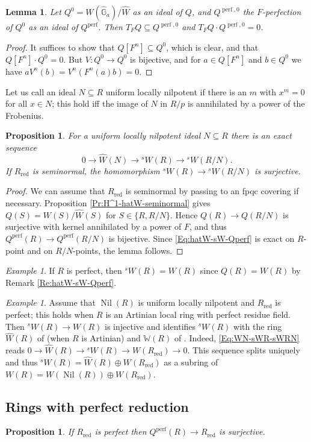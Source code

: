 \documentclass[a4paper,11pt]{amsart}
\theoremstyle{plain}
\newtheorem{Lemma}[equation]{Lemma}
\newtheorem{Prop}[equation]{Proposition}
\theoremstyle{definition}
\theoremstyle{remark}
\newtheorem{Example}[equation]{Example}
\newcommand{\bLe}{\begin{Lemma}}
\newcommand{\eLe}{\end{Lemma}}
\newcommand{\bPr}{\begin{Prop}}
\newcommand{\ePr}{\end{Prop}}
\newcommand{\bEx}{\begin{Example}}
\newcommand{\eEx}{\end{Example}}
\newcommand{\bproof}{\begin{proof}}
\newcommand{\eproof}{\end{proof}}
\newcommand{\beqn}{\begin{equation}}
\newcommand{\eeqn}{\end{equation}}
\numberwithin{equation}{section}
\newcommand{\GG}{{\mathbb{G}}}
\newcommand{\WW}{{\mathbb{W}}}
\DeclareMathOperator{\perf}{perf}
\DeclareMathOperator{\red}{red}
\DeclareMathOperator{\Nil}{Nil}
\newcommand{\limperf}{^{\perf}}
\newcommand{\sW}{{}^sW}
\begin{document}
\bLe
\label{Le:TFQ-Qperf0}
Let $Q^0=W(\hat\GG_a)/\hat W$ as an ideal of $Q$, and $Q^{\perf,0}$ the $F$-perfection of $Q^0$ as an ideal of $Q\limperf$. Then $T_FQ\subseteq Q^{\perf,0}$ and $T_FQ\cdot Q^{\perf,0}=0$.
\eLe

\bproof
It suffices to show that $Q[F^n]\subseteq Q^0$, which is clear, and that $Q[F^n]\cdot Q^0=0$. But $V\colon Q^0\to Q^0$ is bijective, and for $a\in Q[F^n]$ and $b\in Q^0$ we have $aV^n(b)=V^n(F^n(a)b)=0$.
\eproof

Let us call an ideal $N\subseteq R$ uniform locally nilpotent if there is an $m$ with $x^m=0$ for all $x\in N$; this hold iff the image of $N$ in $R/p$ is annihilated by a power of the Frobenius.

\bPr
\label{Pr:WN-sWR-sWRN}
For a uniform locally nilpotent ideal $N\subseteq R$ there is an exact sequence
\beqn
\label{Eq:WN-sWR-sWRN}
0\to\hat W(N)\to\sW(R)\to\sW(R/N).
\eeqn
If $R_{\red}$ is seminormal, the homomorphism $\sW(R)\to\sW(R/N)$ is surjective.
\ePr

\bproof 
We can assume that $R_{\red}$ is seminormal by passing to an fpqc covering if necessary.
Proposition \ref{Pr:H^1-hatW-seminormal} gives $Q(S)=W(S)/\hat W(S)$ for $S\in\{R,R/N\}$. Hence $Q(R)\to Q(R/N)$ is surjective with kernel annihilated by a power of $F$, and thus $Q\limperf(R)\to Q\limperf(R/N)$ is bijective. Since \eqref{Eq:hatW-sW-Qperf} is exact on $R$-point and on $R/N$-points, the lemma follows.
\eproof

\bEx
If $R$ is perfect, then $\sW(R)=W(R)$ since $Q(R)=W(R)$ by Remark \ref{Re:hatW-sW-Qperf}.
\eEx

\bEx
\label{Ex:Artin}
Assume that $\Nil(R)$ is uniform locally nilpotent and $R_{\red}$ is perfect; this holds when $R$ is an Artinian local ring with perfect residue field. Then $\sW(R)\to W(R)$ is injective and identifies $\sW(R)$ with the ring $\hat W(R)$ of \cite{Zink:Dieudonne} (when $R$ is Artinian) and $\WW(R)$ of \cite{Lau:Relations}. Indeed, \eqref{Eq:WN-sWR-sWRN} reads $0\to\hat W(R)\to\sW(R)\to W(R_{\red})\to 0$. This sequence splits uniquely and thus $\sW(R)=\hat W(R)\oplus W(R_{\red})$ as a subring of $W(R)=W(\Nil(R))\oplus W(R_{\red})$.
\eEx

\subsection{Rings with perfect reduction}

\bPr
\label{Pr:Qperf-Rred-surj}
If $R_{\red}$ is perfect then $Q\limperf(R)\to R_{\red}$ is surjective.
\ePr
\end{document}
